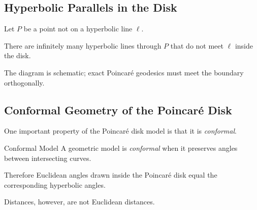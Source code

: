 \subsection{Hyperbolic Parallels in the Disk}
\label{subsec:hyperbolic-parallels-disk}

Let \(P\) be a point not on a hyperbolic line \(\ell\).

There are infinitely many hyperbolic lines through \(P\) that do not meet
\(\ell\) inside the disk.

\begin{centereddiagram}
\end{centereddiagram}

The diagram is schematic; exact Poincar\'e geodesics must meet the boundary
orthogonally.

\subsection{Conformal Geometry of the Poincar\'e Disk}
\label{subsec:poincare-conformal}

One important property of the Poincar\'e disk model is that it is
\emph{conformal}.

\begin{definitionbox}{Conformal Model}
A geometric model is \emph{conformal} when it preserves angles between
intersecting curves.
\end{definitionbox}

Therefore Euclidean angles drawn inside the Poincar\'e disk equal the
corresponding hyperbolic angles.

Distances, however, are not Euclidean distances.

